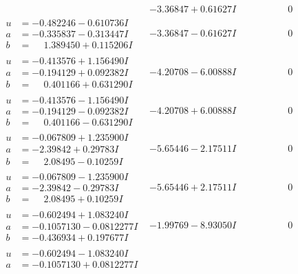 \documentclass[1p]{elsarticle_modified}
\theoremstyle{definition}
\begin{document}
$$\begin{array}{c|c|c}
 & -3.36847 + 0.61627 I & \phantom{-0.000000 } 0 \\ \hline\begin{aligned}
u &= -0.482246 - 0.610736 I \\
a &= -0.335837 - 0.313447 I \\
b &= \phantom{-}1.389450 + 0.115206 I\end{aligned}
 & -3.36847 - 0.61627 I & \phantom{-0.000000 } 0 \\ \hline\begin{aligned}
u &= -0.413576 + 1.156490 I \\
a &= -0.194129 + 0.092382 I \\
b &= \phantom{-}0.401166 + 0.631290 I\end{aligned}
 & -4.20708 - 6.00888 I & \phantom{-0.000000 } 0 \\ \hline\begin{aligned}
u &= -0.413576 - 1.156490 I \\
a &= -0.194129 - 0.092382 I \\
b &= \phantom{-}0.401166 - 0.631290 I\end{aligned}
 & -4.20708 + 6.00888 I & \phantom{-0.000000 } 0 \\ \hline\begin{aligned}
u &= -0.067809 + 1.235900 I \\
a &= -2.39842 + 0.29783 I \\
b &= \phantom{-}2.08495 - 0.10259 I\end{aligned}
 & -5.65446 - 2.17511 I & \phantom{-0.000000 } 0 \\ \hline\begin{aligned}
u &= -0.067809 - 1.235900 I \\
a &= -2.39842 - 0.29783 I \\
b &= \phantom{-}2.08495 + 0.10259 I\end{aligned}
 & -5.65446 + 2.17511 I & \phantom{-0.000000 } 0 \\ \hline\begin{aligned}
u &= -0.602494 + 1.083240 I \\
a &= -0.1057130 - 0.0812277 I \\
b &= -0.436934 + 0.197677 I\end{aligned}
 & -1.99769 - 8.93050 I & \phantom{-0.000000 } 0 \\ \hline\begin{aligned}
u &= -0.602494 - 1.083240 I \\
a &= -0.1057130 + 0.0812277 I \\

\end{aligned}
\end{array}$$
\end{document}
